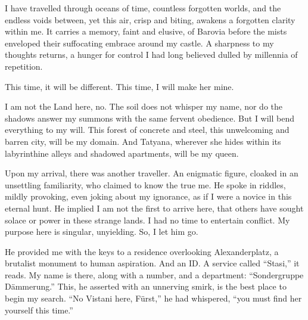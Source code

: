
I have travelled through oceans of time, countless forgotten worlds, and the endless voids between, yet this air, crisp and biting, awakens a forgotten clarity within me.
It carries a memory, faint and elusive, of Barovia before the mists enveloped their suffocating embrace around my castle.
A sharpness to my thoughts returns, a hunger for control I had long believed dulled by millennia of repetition.

This time, it will be different.
This time, I will make her mine.

I am not the Land here, no.
The soil does not whisper my name, nor do the shadows answer my summons with the same fervent obedience.
But I will bend everything to my will.
This forest of concrete and steel, this unwelcoming and barren city, will be my domain.
And Tatyana, wherever she hides within its labyrinthine alleys and shadowed apartments, will be my queen.

Upon my arrival, there was another traveller.
An enigmatic figure, cloaked in an unsettling familiarity, who claimed to know the true me.
He spoke in riddles, mildly provoking, even joking about my ignorance, as if I were a novice in this eternal hunt.
He implied I am not the first to arrive here, that others have sought solace or power in these strange lands.
I had no time to entertain conflict.
My purpose here is singular, unyielding.
So, I let him go.

He provided me with the keys to a residence overlooking Alexanderplatz, a brutalist monument to human aspiration.
And an ID.
A service called ``Stasi,'' it reads.
My name is there, along with a number, and a department: ``Sondergruppe Dämmerung.''
This, he asserted with an unnerving smirk, is the best place to begin my search.
``No Vistani here, Fürst,'' he had whispered, ``you must find her yourself this time.''

\vfill\newpage

